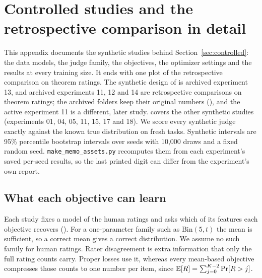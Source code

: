 \section{Controlled studies and the retrospective comparison in detail}
\label{app:controlled}

This appendix documents the synthetic studies behind Section~\ref{sec:controlled}: the data models, the judge family, the objectives, the optimizer settings and the results at every training size.
It ends with one plot of the retrospective comparison on theorem ratings.
The synthetic design of  is archived experiment 13, and archived experiments 11, 12 and 14 are retrospective comparisons on theorem ratings; the archived folders keep their original numbers (), and the active experiment 11 is a different, later study.
 covers the other synthetic studies (experiments 01, 04, 05, 11, 15, 17 and 18).
We score every synthetic judge exactly against the known true distribution on fresh tasks.
Synthetic intervals are 95\% percentile bootstrap intervals over seeds with 10{,}000 draws and a fixed random seed.
\texttt{make\_memo\_assets.py} recomputes them from each experiment's saved per-seed results, so the last printed digit can differ from the experiment's own report.

\subsection{What each objective can learn}
\label{app:controlled-learn}

Each study fixes a model of the human ratings and asks which of its features each objective recovers ().
For a one-parameter family such as $\mathrm{Bin}(5,t)$ the mean is sufficient, so a correct mean gives a correct distribution.
We assume no such family for human ratings.
Rater disagreement is extra information that only the full rating counts carry.
Proper losses use it, whereas every mean-based objective compresses those counts to one number per item, since $\mathbb{E}[R]=\sum_{j=0}^{K-2}\Pr[R>j]$.

